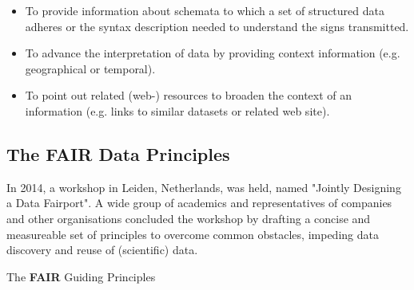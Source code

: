 \documentclass[a4paper,english,twoside,BCOR1.5cm,headsepline,DIV12,appendixprefix,final,12pt]{scrbook}
\begin{document}
\begin{itemize}
\item To provide information about schemata to which a set of structured data adheres or the syntax description needed to understand the signs transmitted.
\item To advance the interpretation of data by providing context information (e.g. geographical or temporal).
\item To point out related (web-) resources to broaden the context of an information (e.g. links to similar datasets or related web site).
\end{itemize}



\subsection{The FAIR Data Principles}
\label{sec:fair}

In 2014, a workshop in Leiden, Netherlands, was held, named "Jointly Designing a Data Fairport". A wide group of academics and representatives of companies and other organisations concluded the workshop by drafting a concise and measureable set of principles to overcome common obstacles, impeding data discovery and reuse of (scientific) data.

The \textbf{FAIR} Guiding Principles \cite{fair2016}
\end{document}
